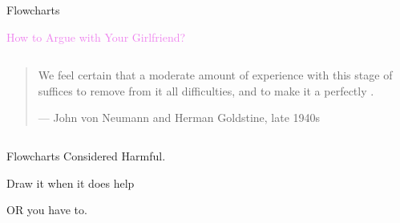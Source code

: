 \begin{frame}{}
  \centerline{\LARGE Flowcharts}

  \vspace{1.00cm}
  \centerline{\textcolor{violet}{How to Argue with Your Girlfriend?}}
\end{frame}

\begin{frame}{}
  \begin{columns}
  \end{columns}
  
  \vspace{0.50cm}
  \pause
  \begin{quote}
    We feel certain that a moderate amount of experience with this stage of 
    suffices to remove from it all difficulties,
    and to make it a perfectly .

    \hfill --- John von Neumann and Herman Goldstine, late 1940s
  \end{quote}
\end{frame}

\begin{frame}{}
  \begin{columns}
    \pause
  \end{columns}


\end{frame}

\begin{frame}{}

  \centerline{Flowcharts Considered Harmful.}
\end{frame}

\begin{frame}{}

  \vspace{0.50cm}
  \pause
  \centerline{\Large Draw it when it does help} 

  \vspace{0.20cm}
  \pause
  \centerline{\Large OR you have to.}
\end{frame}
